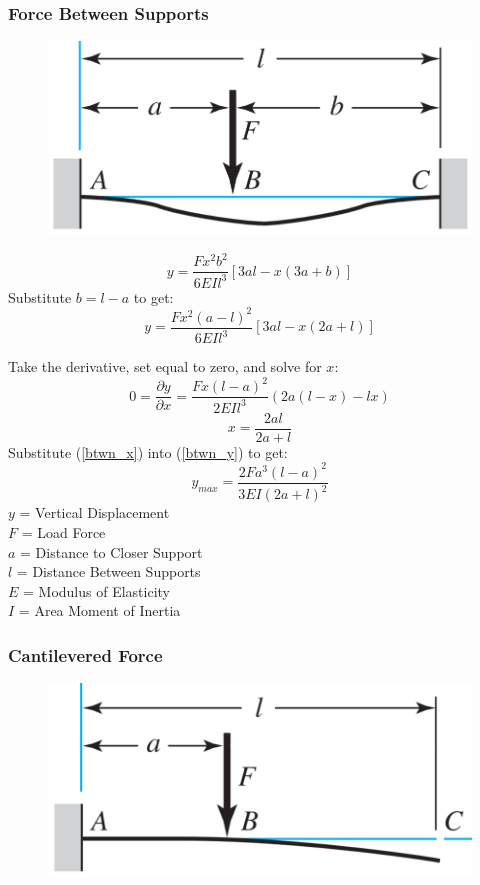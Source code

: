\documentclass[11pt,a4paper,titlepage]{article}
\begin{document}
	\subsubsection{Force Between Supports}
	\begin{figure}[H]
		\centering
		\includegraphics[width=0.7\linewidth]{"Force_Btwn_Supports"}
	\end{figure}
	
	\begin{equation}
		y = \frac{F x^2 b^2}{6 EI l^3} [3al-x(3a+b)]
	\end{equation}
	Substitute $b=l-a$ to get:
	\begin{equation} \label{btwn_y}
		y = \frac{F x^2 (a-l)^2}{6 EI l^3} [3al-x(2a+l)]
	\end{equation}
	
	Take the derivative, set equal to zero, and solve for $x$:
	\begin{equation}
		0 = \frac{\partial y}{\partial x} = \frac{F x (l-a)^2}{2 EI l^3} (2a (l-x) - lx)
	\end{equation}
	\begin{equation} \label{btwn_x}
		x = \frac{2al}{2a + l}
	\end{equation}
	Substitute (\ref{btwn_x}) into (\ref{btwn_y}) to get:
	\begin{equation}
		y_{max} = \frac{2 F a^3 (l-a)^2}{3 EI (2a+l)^2}
	\end{equation}
	$y$ = Vertical Displacement \\
	$F$ = Load Force \\
	$a$ = Distance to Closer Support \\
	$l$ = Distance Between Supports \\
	$E$ = Modulus of Elasticity \\
	$I$ = Area Moment of Inertia
	
	\subsubsection{Cantilevered Force}
	\begin{figure}[H]
		\centering
		\includegraphics[width=0.7\linewidth]{"Cantilievered_Force"}
	\end{figure}
	
\end{document}

